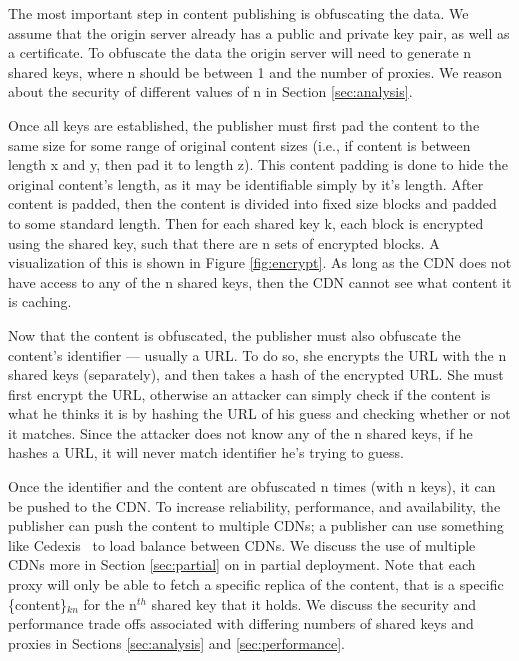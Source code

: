 The most important step in content publishing is obfuscating the data.  We assume that the origin 
server already has a public and private key pair, as well as a certificate.  To obfuscate the data 
the origin server will need to generate n shared keys, where n should be between 1 and the number of 
proxies.  We reason about the security of different values of n in Section \ref{sec:analysis}.  

Once all keys are established, the publisher must first pad the content to the same size for some 
range of original content sizes (i.e., if content is between length x and y, then pad it to length 
z).  This content padding is done to hide the original content's length, as it may be identifiable 
simply by it's length.  After content is padded, then the content is divided into fixed size blocks and padded to 
some standard length.  Then for each shared key k, each block is encrypted using the shared key, 
such that there are n sets of encrypted blocks.  A visualization of this is shown in Figure \ref{fig:encrypt}.  
As long as the CDN does not have access to any of the n shared keys, then the CDN cannot see what content 
it is caching.  

Now that the content is obfuscated, the publisher must also obfuscate the content's identifier --- usually 
a URL.  To do so, she encrypts the URL with the n shared keys (separately), and then takes a hash of the 
encrypted URL.  She must first encrypt the URL, otherwise an attacker can simply check if the content is 
what he thinks it is by hashing the URL of his guess and checking whether or not it matches.  Since the attacker 
does not know any of the n shared keys, if he hashes a URL, it will never match identifier he's trying to guess.  

Once the identifier and the content are obfuscated n times (with n keys), it can be pushed to the 
CDN.  To increase reliability, performance, and availability, the publisher can push the content to 
multiple CDNs; a publisher can use something like Cedexis~\cite{cedexis} to load balance between 
CDNs.  We discuss the use of multiple CDNs more in Section \ref{sec:partial} on \system{} in 
partial deployment.  Note that each proxy will only be able to fetch a specific replica of the content, that is a 
specific \{content\}$_{kn}$ for the n$^{th}$ shared key that it holds.  We discuss the security and performance trade offs 
associated with differing numbers of shared keys and proxies in Sections \ref{sec:analysis} and \ref{sec:performance}.

